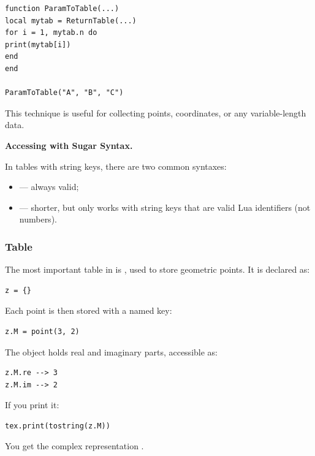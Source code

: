 \begin{mybox}
\begin{verbatim}
function ParamToTable(...)
local mytab = ReturnTable(...)
for i = 1, mytab.n do
print(mytab[i])
end
end

ParamToTable("A", "B", "C")
\end{verbatim}
\end{mybox}

This technique is useful for collecting points, coordinates, or any variable-length data.

\textbf{Accessing with Sugar Syntax.}

In tables with string keys, there are two common syntaxes:

\begin{itemize}
\item {} — always valid;
\item {} — shorter, but only works with string keys that are valid Lua identifiers (not numbers).
\end{itemize}

\subsubsection{Table }

The most important table in  is , used to store geometric points. It is declared as:

\begin{verbatim}
z = {}
\end{verbatim}

Each point is then stored with a named key:

\begin{mybox}
\begin{verbatim}
z.M = point(3, 2)
\end{verbatim}
\end{mybox}

The object  holds real and imaginary parts, accessible as:

\begin{verbatim}
z.M.re --> 3
z.M.im --> 2
\end{verbatim}

If you print it:

\begin{verbatim}
tex.print(tostring(z.M))
\end{verbatim}

You get the complex representation .

